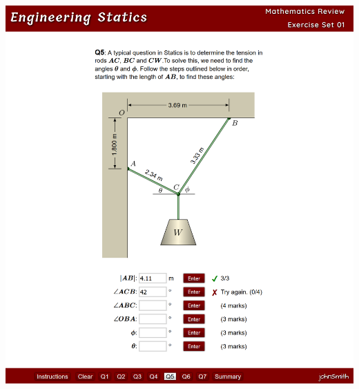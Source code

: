 \documentclass[11pt,xcolor={svgnames, x11names}]{beamer}
\begin{document}
\begin{frame}
	\centering
	\setlength{\fboxsep}{0pt}%
	\setlength{\fboxrule}{0.5pt}%
	\includegraphics[scale=0.29, cfbox=gray]{./images/cover.png}	
\end{frame}	

\end{document}
